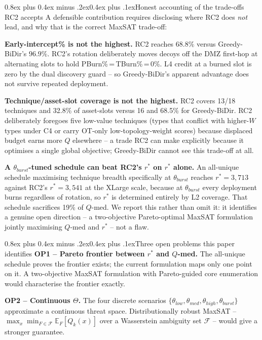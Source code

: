\documentclass[10pt,twocolumn]{article}
\makeatletter
\renewcommand{\subsection}{\@startsection{subsection}{2}{0pt}%
  {0.8ex plus 0.4ex minus .2ex}{0.4ex plus .1ex}{\normalfont\bfseries}}
\makeatother
\begin{document}
\subsection{Honest accounting of the trade-offs RC2 accepts}
A defensible contribution requires disclosing where RC2 does \emph{not} lead, and why that is the correct MaxSAT trade-off:

\textbf{Early-intercept\% is not the highest.} RC2 reaches $68.8\%$ versus Greedy-BiDir's $96.9\%$. RC2's rotation deliberately moves decoys off the DMZ first-hop at alternating slots to hold PBurn\%\,=\,TBurn\%\,=\,0\%. L4 credit at a burned slot is zero by the dual discovery guard -- so Greedy-BiDir's apparent advantage does not survive repeated deployment.

\textbf{Technique/asset-slot coverage is not the highest.} RC2 covers 13/18 techniques and 32.8\% of asset-slots versus 16 and 68.5\% for Greedy-BiDir. RC2 deliberately foregoes five low-value techniques (types that conflict with higher-$W$ types under C4 or carry OT-only low-topology-weight scores) because displaced budget earns more $Q$ elsewhere -- a trade RC2 can make explicitly because it optimises a single global objective; Greedy-BiDir cannot see this trade-off at all.

\textbf{A $\theta_{burst}$-tuned schedule can beat RC2's $r^*$ on $r^*$ alone.} An all-unique schedule maximising technique breadth specifically at $\theta_{burst}$ reaches $r^*{=}3{,}713$ against RC2's $r^*{=}3{,}541$ at the XLarge scale, because at $\theta_{burst}$ every deployment burns regardless of rotation, so $r^*$ is determined entirely by L2 coverage. That schedule sacrifices 19\% of $Q$-med. We report this rather than omit it: it identifies a genuine open direction -- a two-objective Pareto-optimal MaxSAT formulation jointly maximising $Q$-med and $r^*$ -- not a flaw.

\subsection{Three open problems this paper identifies}
\textbf{OP1 -- Pareto frontier between $r^*$ and $Q$-med.} The all-unique schedule proves the frontier exists; the current formulation maps only one point on it. A two-objective MaxSAT formulation with Pareto-guided core enumeration would characterise the frontier exactly.

\textbf{OP2 -- Continuous $\Theta$.} The four discrete scenarios $\{\theta_{low},\theta_{med},\theta_{high},\theta_{burst}\}$ approximate a continuous threat space. Distributionally robust MaxSAT -- $\max_x\min_{F\in\mathcal{F}}\mathbb{E}_F[Q_k(x)]$ over a Wasserstein ambiguity set $\mathcal{F}$ -- would give a stronger guarantee.
\end{document}
